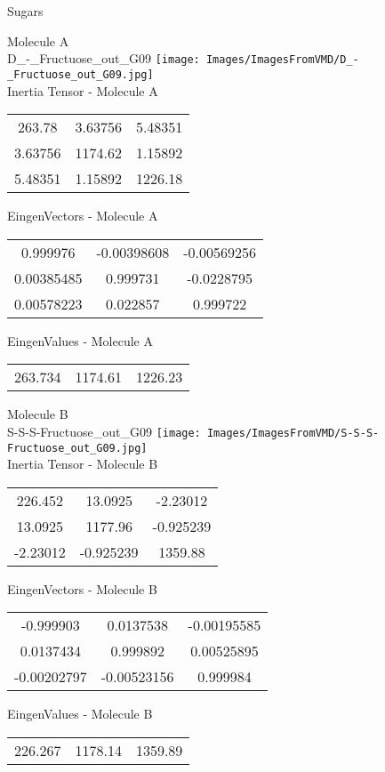 \vtab[-2cm]
\begin{center}
{\large Sugars}
\end{center}
\begin{multicols}{2}
\begin{center}
Molecule A \\ 
D\_-\_Fructuose\_out\_G09
\texttt{[image: Images/ImagesFromVMD/D\_-\_Fructuose\_out\_G09.jpg]}
\\
Inertia Tensor - Molecule A \\
\vtab
\begin{tabular}{|c c c|}
263.78	 & 	3.63756	 & 	5.48351	 \\
3.63756	 & 	1174.62	 & 	1.15892	 \\
5.48351	 & 	1.15892	 & 	1226.18
\end{tabular}

\vtab
 EingenVectors - Molecule A     \\
\vtab
\begin{tabular}{|c c c|}
0.999976	 & 	-0.00398608	 & 	-0.00569256	 \\
0.00385485	 & 	0.999731	 & 	-0.0228795	 \\
0.00578223	 & 	0.022857	 & 	0.999722
\end{tabular}

\vtab
 EingenValues - Molecule A     \\
\vtab
\begin{tabular}{|c c c|}
263.734	 & 	1174.61	 & 	1226.23
\end{tabular}
\columnbreak

Molecule B \\ 
S-S-S-Fructuose\_out\_G09
\texttt{[image: Images/ImagesFromVMD/S-S-S-Fructuose\_out\_G09.jpg]}
\\
Inertia Tensor - Molecule B \\
\vtab
\begin{tabular}{|c c c|}
226.452	 & 	13.0925	 & 	-2.23012	 \\
13.0925	 & 	1177.96	 & 	-0.925239	 \\
-2.23012	 & 	-0.925239	 & 	1359.88
\end{tabular}

\vtab
 EingenVectors - Molecule B     \\
\vtab
\begin{tabular}{|c c c|}
-0.999903	 & 	0.0137538	 & 	-0.00195585	 \\
0.0137434	 & 	0.999892	 & 	0.00525895	 \\
-0.00202797	 & 	-0.00523156	 & 	0.999984
\end{tabular}

\vtab
 EingenValues - Molecule B     \\
\vtab
\begin{tabular}{|c c c|}
226.267	 & 	1178.14	 & 	1359.89
\end{tabular}

\end{center}
\end{multicols}
